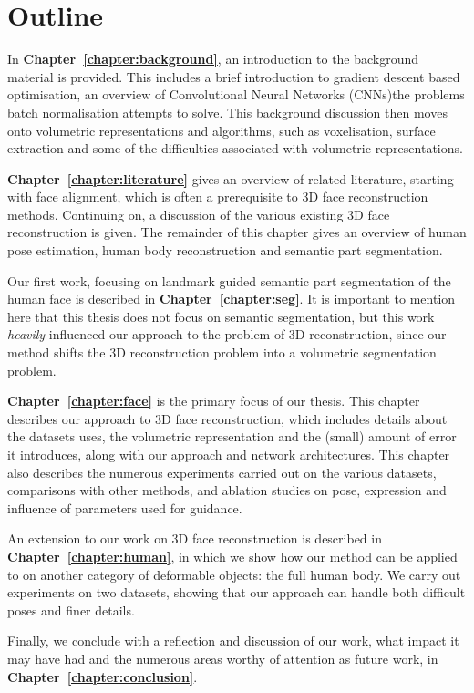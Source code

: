 \section{Outline}

In \textbf{Chapter~\ref{chapter:background}}, an introduction to the
background material is provided. This includes a brief introduction to
gradient descent based optimisation, an overview of Convolutional
Neural Networks (CNNs)the problems batch normalisation attempts to
solve. This background discussion then moves onto volumetric
representations and algorithms, such as voxelisation, surface
extraction and some of the difficulties associated with volumetric
representations.

\textbf{Chapter~\ref{chapter:literature}} gives an overview of related
literature, starting with face alignment, which is often a
prerequisite to 3D face reconstruction methods. Continuing on, a
discussion of the various existing 3D face reconstruction is
given. The remainder of this chapter gives an overview of human pose
estimation, human body reconstruction and semantic part segmentation.

Our first work, focusing on landmark guided semantic part segmentation
of the human face is described in
\textbf{Chapter~\ref{chapter:seg}}. It is important to mention here
that this thesis does not focus on semantic segmentation, but this
work \textit{heavily} influenced our approach to the problem of 3D
reconstruction, since our method shifts the 3D reconstruction problem
into a volumetric segmentation problem.

\textbf{Chapter~\ref{chapter:face}} is the primary focus of our
thesis. This chapter describes our approach to 3D face reconstruction,
which includes details about the datasets uses, the volumetric
representation and the (small) amount of error it introduces, along
with our approach and network architectures. This chapter also
describes the numerous experiments carried out on the various
datasets, comparisons with other methods, and ablation studies on
pose, expression and influence of parameters used for guidance.

An extension to our work on 3D face reconstruction is described in
\textbf{Chapter~\ref{chapter:human}}, in which we show how our method
can be applied to on another category of deformable objects: the full
human body. We carry out experiments on two datasets, showing that our
approach can handle both difficult poses and finer details.

Finally, we conclude with a reflection and discussion of our work,
what impact it may have had and the numerous areas worthy of attention
as future work, in \textbf{Chapter~\ref{chapter:conclusion}}.

